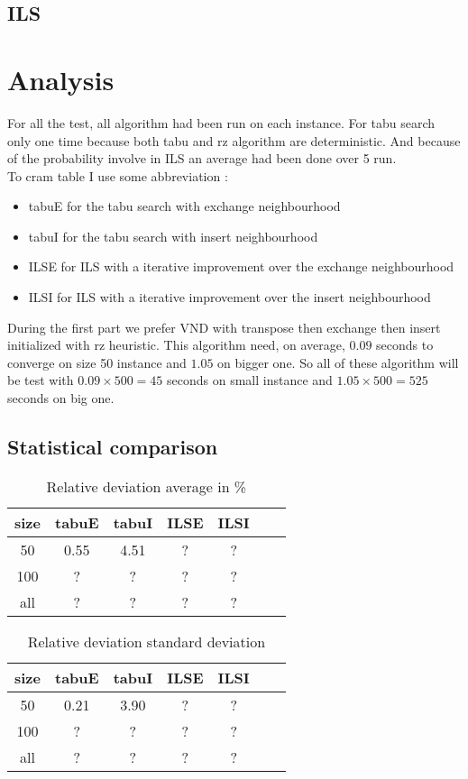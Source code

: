 \documentclass[12pt,a4paper]{article}
\begin{document}
\subsection{ILS}

\section{Analysis}

For all the test, all algorithm had been run on each instance. For tabu search only one time because both tabu and rz algorithm are deterministic. And because of the probability involve in ILS an average had been done over 5 run.\\
To cram table I use some abbreviation :
\begin{itemize}
\item
tabuE for the tabu search with exchange neighbourhood
\item
tabuI for the tabu search with insert neighbourhood
\item
ILSE for ILS with a iterative improvement over the exchange neighbourhood
\item
ILSI for ILS with a iterative improvement over the insert neighbourhood
\end{itemize}
During the first part we prefer VND with transpose then exchange then insert initialized with rz heuristic. This algorithm need, on average, $0.09$ seconds to converge on size 50 instance and $1.05$ on bigger one. So all of these algorithm will be test with $0.09 \times 500 = 45$ seconds on small instance and $1.05 \times 500 = 525$ seconds on big one.

\subsection{Statistical comparison}

\begin{table}[!h]
\centering
\begin{tabular}{|*{7}{c|}}
  \hline
  size & tabuE & tabuI & ILSE & ILSI \\
  \hline
  50 & 0.55 & 4.51 & ? & ? \\ 
  100 & ? & ? & ? & ? \\
  all & ? & ? & ? & ? \\
  \hline
\end{tabular}
\caption{Relative deviation average in \% }
\label{Relative deviation average}
\end{table}

\begin{table}[!h]
\centering
\begin{tabular}{|*{7}{c|}}
  \hline
  size & tabuE & tabuI & ILSE & ILSI \\
  \hline
  50 & 0.21 & 3.90 & ? & ? \\ 
  100 & ? & ? & ? & ? \\
  all & ? & ? & ? & ? \\
  \hline
\end{tabular}
\caption{Relative deviation standard deviation}
\label{Relative deviation standard deviation}
\end{table}
\end{document}
